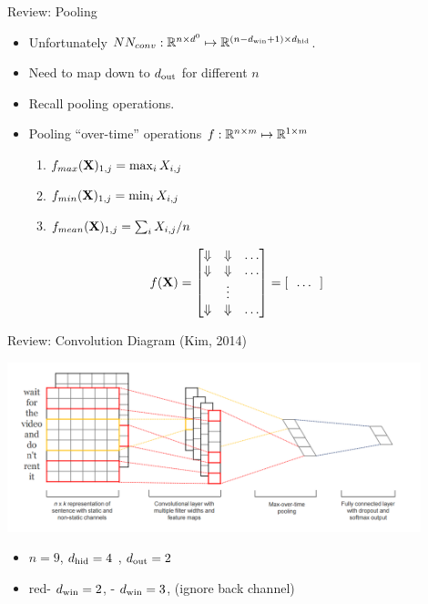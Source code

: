 \documentclass{beamer}
\begin{document}
\begin{frame}{Review: Pooling}
  \begin{itemize}
  \item Unfortunately $NN_{conv}: \mathbb{R}^{n\times d^0 } \mapsto
    \mathbb{R}^{(n - {d_{\mathrm{win}}} + 1) \times {d_{\mathrm{hid}}}}$.
    \air 

  \item Need to map down to ${d_{\mathrm{out}}}$ for different $n$
    \air 

  \item Recall pooling operations. 
    \air 

  \item Pooling ``over-time'' operations $f: \mathbb{R}^{n\times m} \mapsto \mathbb{R}^{1 \times m}  $ 


  \begin{enumerate}
  \item $ f_{max}(\mathbf{X})_{1, j} = \max_{i} X_{i, j} $
  \item $ f_{min}(\mathbf{X})_{1, j} = \min_{i} X_{i, j} $
  \item $ f_{mean}(\mathbf{X})_{1, j} = \sum_i X_{i,j} / n $
  \end{enumerate}

  \end{itemize}

  \[f(\mathbf{X}) =  \begin{bmatrix}\Downarrow & \Downarrow  & \ldots \\   
    \Downarrow & \Downarrow & \ldots\\
    & \vdots \\ 
    \Downarrow &\Downarrow & \ldots \\
  \end{bmatrix} = [ \ \ \ldots \ \ ]  \]

  
\end{frame}

\begin{frame}{Review: Convolution Diagram (Kim, 2014)}
  \begin{center}
    \includegraphics[width=12cm]{kimdiagram}
  \end{center}
  \begin{itemize}
  \item $n = 9$, ${d_{\mathrm{hid}}}=4$ , ${d_{\mathrm{out}}}=2$  
    \air 
  \item \alert{red}- ${d_{\mathrm{win}}} =2$, - ${d_{\mathrm{win}}} =3$, (ignore back channel) 
    \air 

  \end{itemize}
\end{frame}
\end{document}
